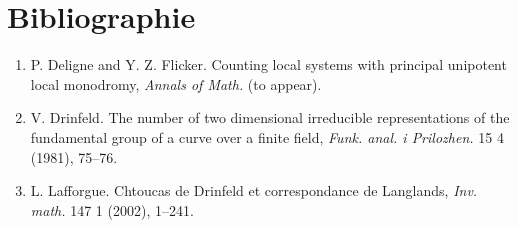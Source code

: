 \documentclass[11pt,a4paper]{article}
\theoremstyle{plain}
\theoremstyle{definition}
\begin{document}
\section*{Bibliographie}

\begin{enumerate}
\item[{[DF]}] P. Deligne and Y. Z. Flicker. Counting local systems with principal unipotent local monodromy, \textit{Annals of Math.} (to appear).
\item[{[Dr]}] V. Drinfeld. The number of two dimensional irreducible representations of the fundamental group of a curve over a finite field, \textit{Funk. anal. i Prilozhen.} 15 4 (1981), 75--76.
\item[{[L]}] L. Lafforgue. Chtoucas de Drinfeld et correspondance de Langlands, \textit{Inv. math.} 147 1 (2002), 1--241.
\end{enumerate}
\end{document}
